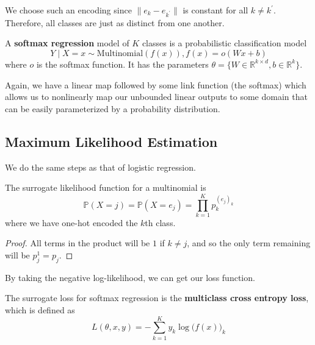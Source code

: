   We choose such an encoding since $\|e_k - e_{k^\prime}\|$ is constant for all $k \neq k^\prime$. Therefore, all classes are just as distinct from one another. 

  \begin{definition}
    A \textbf{softmax regression} model of $K$ classes is a probabilistic classification model 
    \begin{equation}
      Y \mid X = x \sim \mathrm{Multinomial}(f(x)), f(x) = o(Wx + b)
    \end{equation} 
    where $o$ is the softmax function. It has the parameters $\theta = \{W \in \mathbb{R}^{k \times d}, b \in \mathbb{R}^k\}$. 
  \end{definition}

  Again, we have a linear map followed by some link function (the softmax) which allows us to nonlinearly map our unbounded linear outputs to some domain that can be easily parameterized by a probability distribution. 

\subsection{Maximum Likelihood Estimation} 

  We do the same steps as that of logistic regression. 

  \begin{lemma}
    The surrogate likelihood function for a multinomial is 
    \begin{equation}
      \mathbb{P}(X = j) = \mathbb{P}(X = e_j) = \prod_{k=1}^K p_k^{(e_j)_k} 
    \end{equation}
    where we have one-hot encoded the $k$th class. 
  \end{lemma} 
  \begin{proof}
    All terms in the product will be $1$ if $k \neq j$, and so the only term remaining will be $p_j^1 = p_j$. 
  \end{proof} 

  By taking the negative log-likelihood, we can get our loss function. 

  \begin{definition}
    The surrogate loss for softmax regression is the \textbf{multiclass cross entropy loss}, which is defined as 
    \begin{equation}
      L(\theta, x, y) = - \sum_{k=1}^K y_k \log \big( f(x) \big)_k
    \end{equation}
  \end{definition}

